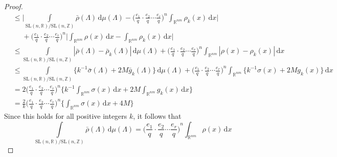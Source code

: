 \documentclass[11pt]{article}
\theoremstyle{definition}
\theoremstyle{proof}
\begin{document}
\begin{proof}
\begin{equation*}
\begin{split}
            & \leq \Bigg|\int\limits_{\mathrm{SL}(n,\mathbb{R})/\mathrm{SL}(n,\mathbb{Z})} \bar{\rho } (\Lambda ) \, \mathrm{d} \mu (\Lambda ) - {\bigg(\frac{e_1}{q} \cdot \frac{e_2}{q} \cdots \frac{e_r}{q} \bigg)}^n \int_{\mathbb{R}^{nm}} \rho _k (x) \, \mathrm{d} x \Bigg| \\
            & \ \ \ \ \ \ + {\bigg(\frac{e_1}{q} \cdot \frac{e_2}{q} \cdots \frac{e_r}{q} \bigg)}^n \Bigg|\int_{\mathbb{R}^{nm}} \rho (x) \, \mathrm{d} x - \int_{\mathbb{R}^{nm}} \rho _k (x) \, \mathrm{d} x \Bigg| \\
            & \leq \int\limits_{\mathrm{SL}(n,\mathbb{R})/\mathrm{SL}(n,\mathbb{Z})} |\bar{\rho } (\Lambda ) - \bar{\rho }_k (\Lambda )| \, \mathrm{d} \mu (\Lambda ) + {\bigg(\frac{e_1}{q} \cdot \frac{e_2}{q} \cdots \frac{e_r}{q} \bigg)}^n \int_{\mathbb{R}^{nm}} |\rho (x) - \rho _k(x)| \, \mathrm{d} x \\
            & \leq \int\limits_{\mathrm{SL}(n,\mathbb{R})/\mathrm{SL}(n,\mathbb{Z})} \big\{k^{-1} \bar{\sigma }(\Lambda ) + 2M \bar{g}_k (\Lambda ) \big\} \, \mathrm{d} \mu (\Lambda ) + {\bigg(\frac{e_1}{q} \cdot \frac{e_2}{q} \cdots \frac{e_r}{q} \bigg)}^n \int_{\mathbb{R}^{nm}} \big\{k^{-1} \sigma (x) + 2M g_k (x) \big\} \, \mathrm{d} x \\
            &= 2{\bigg(\frac{e_1}{q} \cdot \frac{e_2}{q} \cdots \frac{e_r}{q} \bigg)}^n \Bigg\{k^{-1} \int_{\mathbb{R}^{nm}} \sigma (x) \, \mathrm{d} x + 2M \int_{\mathbb{R}^{nm}} g_k(x) \, \mathrm{d} x \Bigg\} \\
            &= \frac{2}{k} {\bigg(\frac{e_1}{q} \cdot \frac{e_2}{q} \cdots \frac{e_r}{q} \bigg)}^n \Bigg\{\int_{\mathbb{R}^{nm}} \sigma (x) \, \mathrm{d} x + 4M \Bigg\}
        \end{split}
    \end{equation*}
    Since this holds for all positive integers $k$, it follows that
    \[
        \int\limits_{\mathrm{SL}(n,\mathbb{R})/\mathrm{SL}(n,\mathbb{Z})} \bar{\rho } (\Lambda ) \, \mathrm{d} \mu (\Lambda ) = {\bigg(\frac{e_1}{q} \cdot \frac{e_2}{q} \cdots \frac{e_r}{q} \bigg)}^n \int_{\mathbb{R}^{nm}} \rho (x) \, \mathrm{d} x
    \]


\end{proof}
\end{document}
